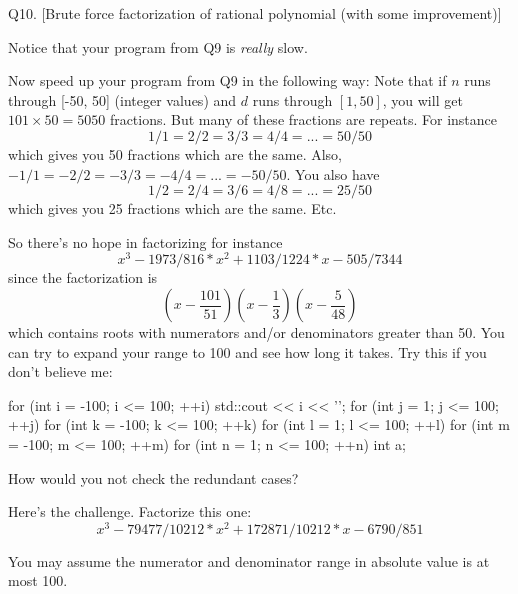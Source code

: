 Q10. [Brute force factorization of rational polynomial (with some improvement)]


Notice that your program from Q9 is \textit{really} slow.

Now speed up your program from Q9 in the following way:
Note that if $n$ runs through [-50, 50] (integer values)
and $d$ runs through $[1, 50]$, you will get $101 \times 50=5050$ fractions.
But many of these fractions are repeats.
For instance
\[
  1/1 = 2/2 = 3/3 = 4/4 = ... = 50/50
\]
which gives you 50 fractions which are the same.
Also, $-1/1 = -2/2 = -3/3 = -4/4 = ... = -50/50$. 
You also have
\[
  1/2 = 2/4 = 3/6 = 4/8 = ... = 25/50
\]
which gives you 25 fractions which are the same.
Etc.


So there's no hope in factorizing for instance
\[
x^3 - 1973/816*x^2 + 1103/1224*x - 505/7344
\]
since the factorization is
\[
  \left( x - \frac{101}{51} \right)
  \left( x - \frac{1}{3} \right)
  \left( x - \frac{5}{48} \right)
\]
which contains roots with numerators and/or denominators greater than 50.
You can try to expand your range to 100 and see how long it takes.
Try this if you don't believe me:
\begin{console}[fontsize=\scriptsize]
for (int i = -100; i <= 100; ++i)
{
    std::cout << i << '\n';
    for (int j = 1; j <= 100; ++j)
    {
        for (int k = -100; k <= 100; ++k)
        {
            for (int l = 1; l <= 100; ++l)
            {
                for (int m = -100; m <= 100; ++m)
                {
                    for (int n = 1; n <= 100; ++n)
                    {
                        int a;
                    }
                }
            }
        }
    }
}
\end{console}

How would you not check the redundant cases?


Here's the challenge. Factorize this one:
\[
  x^3 - 79477/10212*x^2 + 172871/10212*x - 6790/851
\]

You may assume the numerator and denominator range in absolute value is at most 100.


